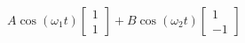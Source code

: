 \documentclass[preview]{standalone}
\begin{document}
\begin{center}
$A\cos(\omega_1 t)\begin{bmatrix} 1 \\ 1\end{bmatrix} + B \cos(\omega_2 t)\begin{bmatrix} 1 \\ -1\end{bmatrix}$
\end{center}
\end{document}
